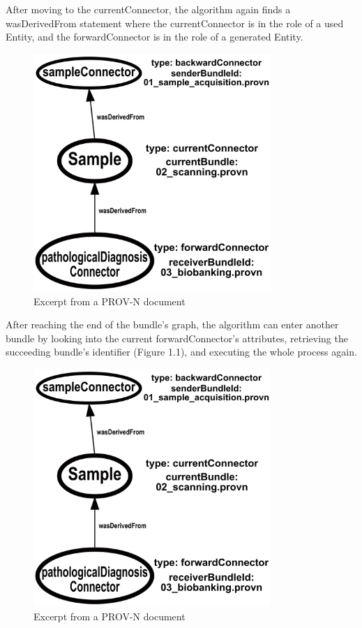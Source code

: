 \documentclass[
  digital,     %
  oneside,     %
  nosansbold,  %
  nocolorbold, %
  lof,         %
  lot,         %
]{fithesis4}
\begin{document}
After moving to the currentConnector, the algorithm again finds a wasDerivedFrom statement where the currentConnector is in the role of a used Entity, and the forwardConnector is in the role of a generated Entity.

\begin{figure}[htbp]
  \begin{center}
    \includegraphics[width=9cm]{fithesis/images/examplebigger.png}
  \end{center}
  \caption{Excerpt from a PROV-N document}
  \label{fig:bundleexample3}
\end{figure}

After reaching the end of the bundle's graph, the algorithm can enter another bundle by looking into the current forwardConnector's attributes, retrieving the succeeding bundle's identifier (Figure 1.1), and executing the whole process again.

\begin{figure}[htbp]
  \begin{center}
    \includegraphics[width=9cm]{fithesis/images/examplebigger.png}
  \end{center}
  \caption{Excerpt from a PROV-N document}
  \label{fig:bundleexample4}
\end{figure}
\end{document}
